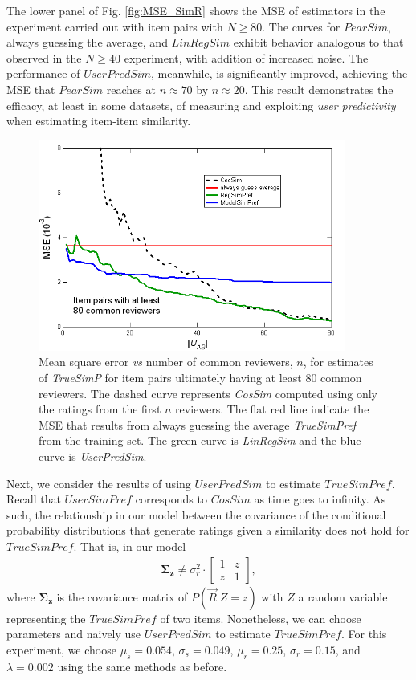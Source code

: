 \documentclass[11pt]{article}
\begin{document}
{The lower panel of Fig. \ref{fig:MSE_SimR} shows the MSE of estimators in the
experiment carried out with item pairs with $N \geq 80$. The curves for
$PearSim$, always guessing the average, and $LinRegSim$ exhibit behavior
analogous to that observed in the $N \geq 40$ experiment, with addition of
increased noise. The performance of $UserPredSim$, meanwhile, is significantly
improved, achieving the MSE that $PearSim$ reaches at $n \approx 70$ by $n
\approx 20$. This result demonstrates the efficacy, at least in some datasets,
of measuring and exploiting {\em user predictivity} when estimating item-item
similarity.

\begin{figure}[!htbp]
    \centering
    \includegraphics[width=0.9\textwidth]{MSE_SimP_80.png}
	\caption{Mean square error {\em vs} number of common reviewers, $n$, for
estimates of {\em TrueSimP} for item pairs ultimately having at least 80 common
reviewers. The dashed curve represents {\em CosSim} computed using only the
ratings from the first $n$ reviewers. The flat red line indicate the MSE that
results from always guessing the average {\em TrueSimPref} from the training
set. The green curve is {\em LinRegSim} and the blue curve is {\em UserPredSim}.
}
    \label{fig:MSE_SimP}
\end{figure}

Next, we consider the results of using $UserPredSim$ to estimate $TrueSimPref$.
Recall that $UserSimPref$ corresponds to $CosSim$ as time goes to infinity. As
such, the relationship in our model between the covariance of the conditional
probability distributions that generate ratings given a similarity does not hold
for $TrueSimPref$. That is, in our model
\begin{align}
\mathbf{\Sigma_z} \neq \sigma_r^2 \cdot
\left[ \begin{array}{cc}  1 & z \\ z & 1 \end{array} \right],
\end{align}
where $\mathbf{\Sigma_z}$ is the covariance matrix of $P(\vec{R} | Z=z)$ with
$Z$ a random variable representing the $TrueSimPref$ of two items. Nonetheless,
we can choose parameters and naively use $UserPredSim$ to estimate
$TrueSimPref$. For this experiment, we choose $\mu_s = 0.054$, $\sigma_s =
0.049$, $\mu_r = 0.25$, $\sigma_r = 0.15$, and $\lambda = 0.002$ using the same
methods as before.

}
\end{document}
